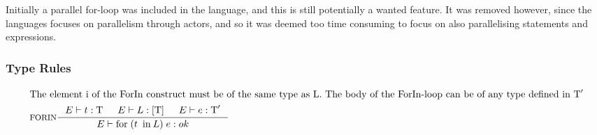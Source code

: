 Initially a parallel for-loop was included in the language, and this is still potentially a wanted feature. It was removed however, since the languages focuses on parallelism through actors, and so it was deemed too time consuming to focus on also parallelising statements and expressions.

\subsubsection{Type Rules}

\begin{align*}
\intertext{The element i of the ForIn construct must be of the same type as L. The body of the ForIn-loop can be of any type defined in $\Tt'$}
&\inference[FORIN]{\Tenv t : \Tt &
                   \Tenv L : [\Tt] &
                  \Tenv e : \Tt'}
                 {\Tenv \mathbin{\text{for}} \; (t \; \mathbin{\text{in}} L) \; {e}: ok}
\end{align*}
